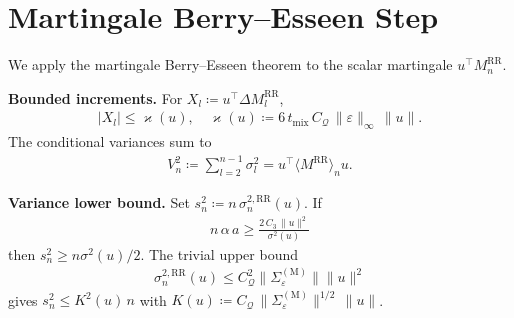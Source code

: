 
\section{Martingale Berry--Esseen Step}

We apply the martingale Berry--Esseen theorem to the scalar martingale
\(u^\top M_n^{\text{RR}}\).

\textbf{Bounded increments.} For \(X_l \coloneqq u^\top \Delta M_l^{\text{RR}}\),
\begin{equation}
\begin{aligned}
|X_l| \le \varkappa(u),
\quad
\varkappa(u) \coloneqq 6 \, t_{\text{mix}} \, C_{\mathcal{Q}} \, \lVert  \varepsilon  \rVert_\infty \, \lVert  u  \rVert.
\end{aligned}
\label{eq:M-RR-incr}
\end{equation}
The conditional variances sum to
\begin{equation}
\begin{aligned}
V_n^2 \coloneqq \sum_{l = 2}^{n - 1} \sigma_l^2 = u^\top \langle M^{\text{RR}} \rangle_n u.
\end{aligned}
\end{equation}

\textbf{Variance lower bound.} Set \(s_n^2 \coloneqq n \, \sigma_n^{2, \text{RR}}(u)\). If
\begin{equation}
\begin{aligned}
n \, \alpha \, a \ge \frac{2 \, C_3 \, \lVert  u  \rVert^2}{\sigma^2(u)}
\end{aligned}
\label{eq:variance-lb-condition}
\end{equation}
then \(s_n^2 \ge n \sigma^2(u) / 2\).
The trivial upper bound
\begin{equation}
\begin{aligned}
\sigma_n^{2, \text{RR}}(u) \le C_{\mathcal{Q}}^2 \lVert  \Sigma_{\varepsilon}^{(\text{M})}  \rVert \lVert  u  \rVert^2
\end{aligned}
\end{equation}
gives \(s_n^2 \le K^2(u) \, n\) with
\(K(u) \coloneqq C_{\mathcal{Q}} \, \lVert  \Sigma_{\varepsilon}^{(\text{M})}  \rVert^{1 / 2} \, \lVert  u  \rVert\).

